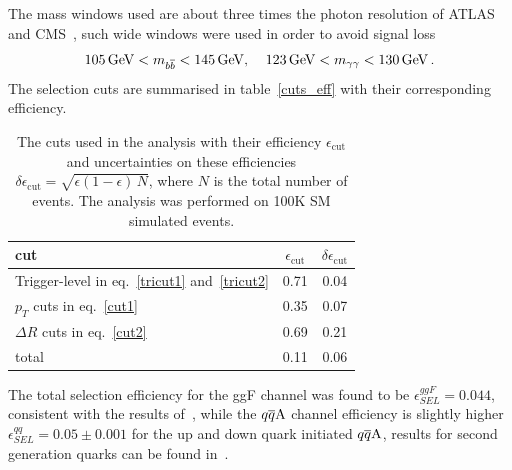 The mass windows used are about three times the photon resolution of ATLAS and CMS~\cite{ATL-PHYS-PUB-2013-009,CMS:2013aoa}, such wide windows were used in order to avoid signal loss
\begin{equation}
	105\,\GeV < m_{b \bar b} < 145 \, \GeV, \; \; \; \;123\, \GeV < m_{\gamma \gamma} < 130 \, \GeV\,.
	\label{cut3}
\end{equation}
The selection cuts are summarised in table~\autoref{cuts_eff} with their corresponding efficiency. 
\begin{table}[!t]
	\centering
	\begin{tabular}{l cc }
		\toprule
		cut  & $\epsilon_{\mathrm{cut}}$  &  $ \delta \epsilon_{\mathrm{cut}}$ \\
		\midrule
		Trigger-level in eq.~\eqref{tricut1} and~\eqref{tricut2} &0.71 & 0.04 \\
		$p_T$ cuts in eq.~\eqref{cut1} & 0.35 & 0.07\\
		$\Delta R$ cuts  in eq.~\eqref{cut2} & 0.69 & 0.21 \\
		\hline
		total    & 0.11 & 0.06 \\
		\bottomrule
	\end{tabular}
	\caption{The cuts used in the analysis with their efficiency $\epsilon_{\mathrm{cut}}$ and uncertainties on these efficiencies $ \delta \epsilon_{\mathrm{cut}} = \sqrt{\epsilon(1-\epsilon)\,N}$, where $N$ is the total number of events. The analysis was performed on 100K SM simulated events. }
	\label{cuts_eff}
\end{table}
%
\par The total selection efficiency for the ggF channel was found to be $\epsilon^{ggF}_{SEL} = 0.044$, consistent with the results of~\cite{Azatov:2015oxa}, while the $q\overline q \rm A$ channel efficiency is slightly higher $\epsilon^{qq}_{SEL} = 0.05 \pm 0.001$ for the up and down quark initiated $ q\overline q \rm A$, results for second generation quarks can be found in~\cite{Alasfar:2019pmn}.
